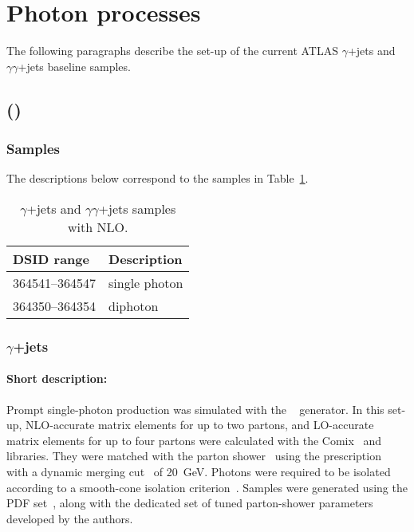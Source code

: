 \section{Photon processes}

The following paragraphs describe the set-up of the current ATLAS $\gamma$+jets and $\gamma\gamma$+jets baseline samples. 

\subsection[Sherpa (MEPS@NLO)]{\SHERPA (\MEPSatNLO)}

\subsubsection*{Samples}

The descriptions below correspond to the samples in Table~\ref{tab:gammajets-sherpa-nlo}.

\begin{table}[!htbp]
  \caption{$\gamma$+jets and $\gamma\gamma$+jets samples with \SHERPA NLO\@.}%
  \label{tab:gammajets-sherpa-nlo}
  \centering
  \begin{tabular}{l l}
    \toprule
    DSID range & Description \\
    \midrule
    364541--364547 & single photon \\ 
    364350--364354 & diphoton  \\
    \bottomrule
  \end{tabular}
\end{table}


\subsubsection{$\gamma$+jets}

\paragraph{Short description:}

Prompt single-photon production was simulated with the
\SHERPA[2.2]~\cite{Bothmann:2019yzt} generator. In this set-up, NLO-accurate
matrix elements for up to two partons, and LO-accurate matrix elements for up
to four partons were calculated with the Comix~\cite{Gleisberg:2008fv} and
\OPENLOOPS~\cite{Buccioni:2019sur,Cascioli:2011va,Denner:2016kdg} libraries. They were matched
with the \SHERPA parton shower~\cite{Schumann:2007mg} using the \MEPSatNLO
prescription~\cite{Hoeche:2011fd,Hoeche:2012yf,Catani:2001cc,Hoeche:2009rj}
with a dynamic merging cut~\cite{Siegert:2016bre} of \SI{20}{\GeV}.
Photons were required to be isolated according to
a smooth-cone isolation criterion~\cite{Frixione:1998jh}. Samples were generated using the
\NNPDF[3.0nnlo] PDF set~\cite{Ball:2014uwa}, along with the dedicated set of
tuned parton-shower parameters developed by the \SHERPA authors.


